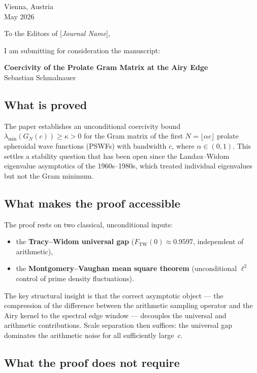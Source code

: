\documentclass[12pt,a4paper]{article}
\begin{document}
\pagestyle{empty}

\noindent
Vienna, Austria\\
May 2026

\bigskip

\noindent
To the Editors of [\textit{Journal Name}],

\bigskip

\noindent
I am submitting for consideration the manuscript:

\medskip
\noindent
\textbf{Coercivity of the Prolate Gram Matrix at the Airy Edge}\\
Sebastian Schmalnauer

\bigskip

\subsection*{What is proved}

The paper establishes an unconditional coercivity bound
$\lambda_{\min}(G_N(c)) \ge \kappa > 0$ for the Gram matrix of the
first $N = \lfloor\alpha c\rfloor$ prolate spheroidal wave functions
(PSWFs) with bandwidth $c$, where $\alpha \in (0,1)$.
This settles a stability question that has been open since the
Landau--Widom eigenvalue asymptotics of the 1960s--1980s,
which treated individual eigenvalues but not the Gram minimum.

\subsection*{What makes the proof accessible}

The proof rests on two classical, unconditional inputs:
\begin{itemize}
  \item the \textbf{Tracy--Widom universal gap}
    ($F_{\mathrm{TW}}(0) \approx 0.9597$, independent of arithmetic),
  \item the \textbf{Montgomery--Vaughan mean square theorem}
    (unconditional $\ell^2$ control of prime density fluctuations).
\end{itemize}
The key structural insight is that the correct asymptotic object
--- the compression of the difference between the arithmetic sampling
operator and the Airy kernel to the spectral edge window
--- decouples the universal and arithmetic contributions.
Scale separation then suffices: the universal gap dominates
the arithmetic noise for all sufficiently large~$c$.

\subsection*{What the proof does not require}
\end{document}
